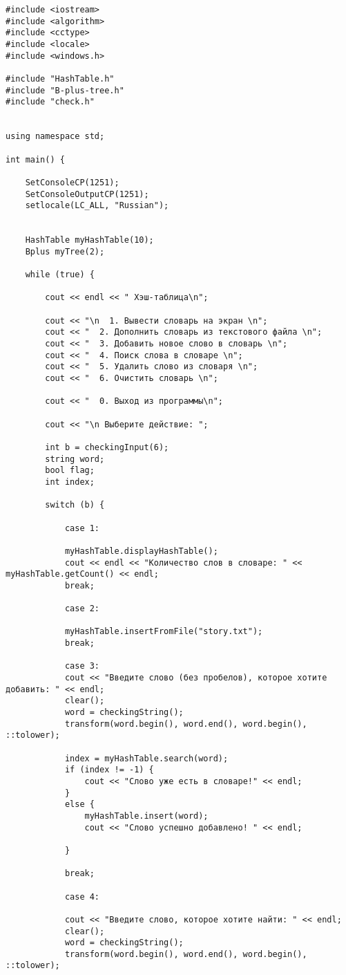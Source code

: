 \documentclass[11pt,a4paper,final]{article} %
\begin{document}
\begin{lstlisting}
#include <iostream>
#include <algorithm>
#include <cctype> 
#include <locale>
#include <windows.h>

#include "HashTable.h"
#include "B-plus-tree.h"
#include "check.h"


using namespace std;

int main() {
	
	SetConsoleCP(1251);
	SetConsoleOutputCP(1251);
	setlocale(LC_ALL, "Russian");
	
	
	HashTable myHashTable(10);
	Bplus myTree(2);
	
	while (true) {
		
		cout << endl << " Хэш-таблица\n";
		
		cout << "\n  1. Вывести словарь на экран \n";
		cout << "  2. Дополнить словарь из текстового файла \n";
		cout << "  3. Добавить новое слово в словарь \n";
		cout << "  4. Поиск слова в словаре \n";
		cout << "  5. Удалить слово из словаря \n";
		cout << "  6. Очистить словарь \n";
		
		cout << "  0. Выход из программы\n";
		
		cout << "\n Выберите действие: ";
		
		int b = checkingInput(6);
		string word;
		bool flag;
		int index;
		
		switch (b) {
			
			case 1:
			
			myHashTable.displayHashTable();
			cout << endl << "Количество слов в словаре: " << myHashTable.getCount() << endl;
			break;
			
			case 2:
			
			myHashTable.insertFromFile("story.txt");
			break;
			
			case 3:
			cout << "Введите слово (без пробелов), которое хотите добавить: " << endl;
			clear();
			word = checkingString();
			transform(word.begin(), word.end(), word.begin(), ::tolower);
			
			index = myHashTable.search(word);
			if (index != -1) {
				cout << "Слово уже есть в словаре!" << endl;
			}
			else {
				myHashTable.insert(word);
				cout << "Слово успешно добавлено! " << endl;
				
			}
			
			break;
			
			case 4:
			
			cout << "Введите слово, которое хотите найти: " << endl;
			clear();
			word = checkingString();
			transform(word.begin(), word.end(), word.begin(), ::tolower);
			

\end{lstlisting}
\end{document}
